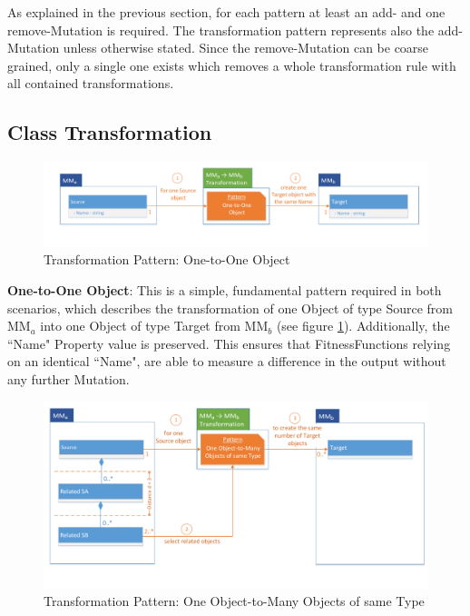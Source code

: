 As explained in the previous section, for each pattern at least an add- and one remove-\gls{Mutation} is required. The transformation pattern represents also the add-\gls{Mutation} unless otherwise stated. Since the remove-\gls{Mutation} can be coarse grained, only a single one exists which removes a whole transformation rule with all contained transformations.

\subsection{Class Transformation}
\label{secClassTransformation}

\begin{figure}[!ht]
	\centering
	\includegraphics[scale=0.48, trim=0cm 1cm 0cm 0cm, clip=true]{Images/TransformationPattern_OneToOneObjectOfSameType.pdf} 
	\caption{Transformation Pattern: One-to-One Object}
	\label{figTransformationPattern_OneToOneObjectOfSameType}
\end{figure}

\textbf{One-to-One Object}: This is a simple, fundamental pattern required in both scenarios, which describes the transformation of one \gls{Object} of type Source from MM$_a$ into one \gls{Object} of type Target from MM$_b$ (see figure \ref{figTransformationPattern_OneToOneObjectOfSameType}). Additionally, the ``Name" \gls{Property} value is preserved. This ensures that \glspl{FitnessFunction} relying on an identical ``Name", are able to measure a difference in the output without any further \gls{Mutation}.

\begin{figure}[!ht]
	\centering
	\includegraphics[scale=0.48, trim=0cm 1cm 0cm 0cm, clip=true]{Images/TransformationPattern_OneToManyObjectsOfSameType.pdf} 
	\caption{Transformation Pattern: One Object-to-Many Objects of same Type}
	\label{figTransformationPattern_OneToManyObjectsOfSameType}
\end{figure}
 
